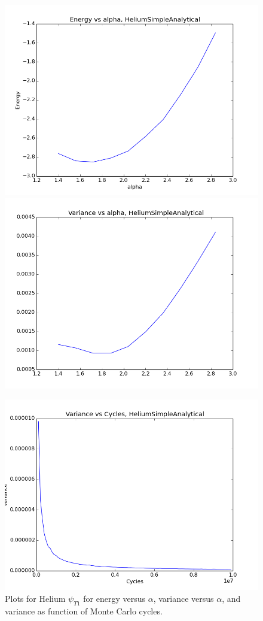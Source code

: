 \documentclass[11pt]{article}
\begin{document}
	\begin{figure}
	\centering \includegraphics[width=0.45\linewidth]{figures/EnergyVsAlphaHeliumSimpleAnalytical}
	\includegraphics[width=0.45\linewidth]{figures/VarianceVsAlphaHeliumSimpleAnalytical}

	\includegraphics[width=0.45\linewidth]{figures/VarianceNCyclesHeliumSimpleAnalytical}\protect\protect\caption{Plots for Helium $\psi_{T1}$ for energy versus $\alpha$, variance versus $\alpha$, and variance as function of Monte Carlo cycles.}
	\label{fig01:alpha_Simple}
	\end{figure}
\end{document}

